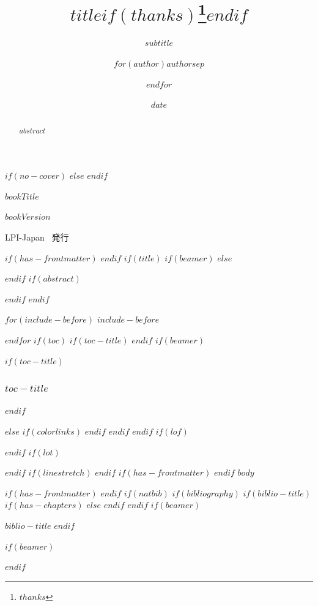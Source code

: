 \documentclass[
$if(fontsize)$
  $fontsize$,
$endif$
$if(papersize)$
  $papersize$paper,
$endif$
$if(beamer)$
  ignorenonframetext,
$if(handout)$
  handout,
$endif$
$if(aspectratio)$
  aspectratio=$aspectratio$,
$endif$
$endif$
$for(classoption)$
  $classoption$$sep$,
$endfor$
]{$documentclass$}
\title{$title$$if(thanks)$\thanks{$thanks$}$endif$}
\subtitle{$subtitle$}
\author{$for(author)$$author$$sep$ \and $endfor$}
\date{$date$}
\institute{$for(institute)$$institute$$sep$ \and $endfor$}
\newif\ifbibliography
\begin{document}
$if(no-cover)$
$else$
\thispagestyle{empty}
\null
\cleardoublepage
$endif$

\thispagestyle{empty}
\begin{center}
  \vspace*{6cm}
  {\Huge $bookTitle$}

  \vfill

  {\Large $bookVersion$}

  {\Large LPI-Japan \, 発行}

  \vspace*{4cm}
\end{center}
\newpage

$if(has-frontmatter)$
\frontmatter
$endif$
$if(title)$
$if(beamer)$
\frame{\titlepage}
$else$
\maketitle
$endif$
$if(abstract)$
\begin{abstract}
$abstract$
\end{abstract}
$endif$
$endif$


$for(include-before)$
$include-before$

$endfor$
\newpage
$if(toc)$
$if(toc-title)$
\renewcommand*\contentsname{$toc-title$}
$endif$
$if(beamer)$
\begin{frame}[allowframebreaks]
$if(toc-title)$
  \frametitle{$toc-title$}
$endif$
  \tableofcontents[hideallsubsections]
\end{frame}
$else$
{
$if(colorlinks)$
\hypersetup{linkcolor=$if(toccolor)$$toccolor$$else$$endif$}
$endif$
\setcounter{tocdepth}{$toc-depth$}
\tableofcontents
\newpage
}
$endif$
$endif$
$if(lof)$
\listoffigures
$endif$
$if(lot)$
\listoftables
$endif$
$if(linestretch)$
$endif$
$if(has-frontmatter)$
\mainmatter
$endif$
$body$

$if(has-frontmatter)$
\backmatter
$endif$
$if(natbib)$
$if(bibliography)$
$if(biblio-title)$
$if(has-chapters)$
\renewcommand\bibname{$biblio-title$}
$else$
\renewcommand\refname{$biblio-title$}
$endif$
$endif$
$if(beamer)$
\begin{frame}[allowframebreaks]{$biblio-title$}
  \bibliographytrue
$endif$
  
$if(beamer)$
\end{frame}
$endif$
\end{document}
